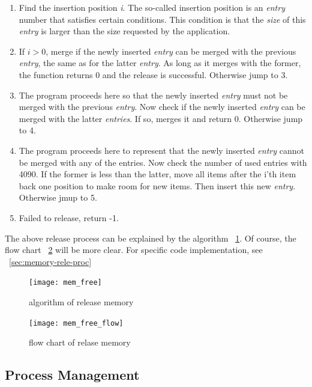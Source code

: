 \documentclass{swfcthesis}
\begin{document}
\begin{enumerate}
\item Find the insertion position \emph{i}. The so-called insertion position is an \emph{entry}
  number that satisfies certain conditions. This condition is that the \emph{size} of this
  \emph{entry} is larger than the size requested by the application.
\item If $i > 0$, merge if the newly inserted \emph{entry} can be merged with the previous \emph{entry},
  the same as for the latter \emph{entry}. As long as it merges with the former, the
  function returns 0 and the release is successful. Otherwise jump to 3.
\item The program proceeds here so that the newly inserted \emph{entry} must not be
  merged with the previous \emph{entry}. Now check if the newly inserted \emph{entry}
  can be merged with the latter \emph{entries}. If so, merges it and return 0. Otherwise
  jump to 4.
\item The program proceeds here to represent that the newly inserted \emph{entry} cannot be
  merged with any of the entries. Now check the number of used entries with 4090. If the
  former is less than the latter, move all items after the i'th item back one position to
  make room for new items. Then insert this new \emph{entry}. Otherwise jmup to 5.

\item Failed to release, return -1.
\end{enumerate}
The above release process can be explained by the algorithm ~\ref{fig:mem-relase-algo}. Of
course, the flow chart ~\ref{fig:mem-relase-flow} will be more clear. For specific code
implementation, see ~\ref{sec:memory-rele-proc}


\begin{figure}[!ht]
  \centering
  \texttt{[image: mem\_free]}
  \caption{algorithm of release memory}
  \label{fig:mem-relase-algo}
\end{figure}

\begin{figure}[!ht]
  \centering
  \texttt{[image: mem\_free\_flow]}
  \caption{flow chart of relase memory}
  \label{fig:mem-relase-flow}
\end{figure}

\subsection{Process Management}
\label{sec:process-management}
\end{document}
